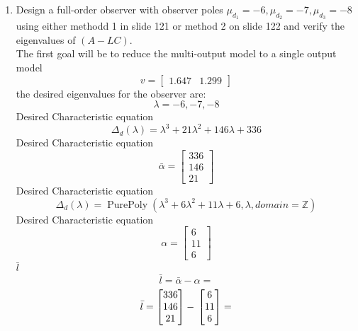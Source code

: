   \begin{enumerate}
  \item Design a full-order observer with observer poles $\mu_{d_1} = -6, \mu_{d_2} = -7, \mu_{d_3}=-8$ using
    either methodd 1 in slide 121 or method 2 on slide 122 and verify the eigenvalues of
    $(A-LC)$. \\
    The first goal will be to reduce the multi-output model to a single
output model
\begin{equation}
v = \left[\begin{matrix}1.647 & 1.299\end{matrix}\right]
\end{equation}
the desired eigenvalues for the observer are: 
\begin{equation}
\lambda = -6, -7, -8
\end{equation}
Desired Characteristic equation
\begin{equation}
\Delta_d(\lambda) = \lambda^{3} + 21 \lambda^{2} + 146 \lambda + 336
\end{equation}
Desired Characteristic equation
\begin{equation}
\bar \alpha = \left[\begin{matrix}336\\146\\21\end{matrix}\right]
\end{equation}
Desired Characteristic equation
\begin{equation}
\Delta_d(\lambda) = \operatorname{PurePoly}{\left( \lambda^{3} + 6 \lambda^{2} + 11 \lambda + 6, \lambda, domain=\mathbb{Z} \right)}
\end{equation}
Desired Characteristic equation
\begin{equation}
\alpha = \left[\begin{matrix}6\\11\\6\end{matrix}\right]
\end{equation}
$\bar l$
\begin{equation}
  \bar l = \bar \alpha - \alpha = 
\end{equation}
\begin{equation}
  \bar l = \left[\begin{matrix}336\\146\\21\end{matrix}\right] - \\\left[\begin{matrix}6\\11\\6\end{matrix}\right] = 

\end{equation}
\end{enumerate}
